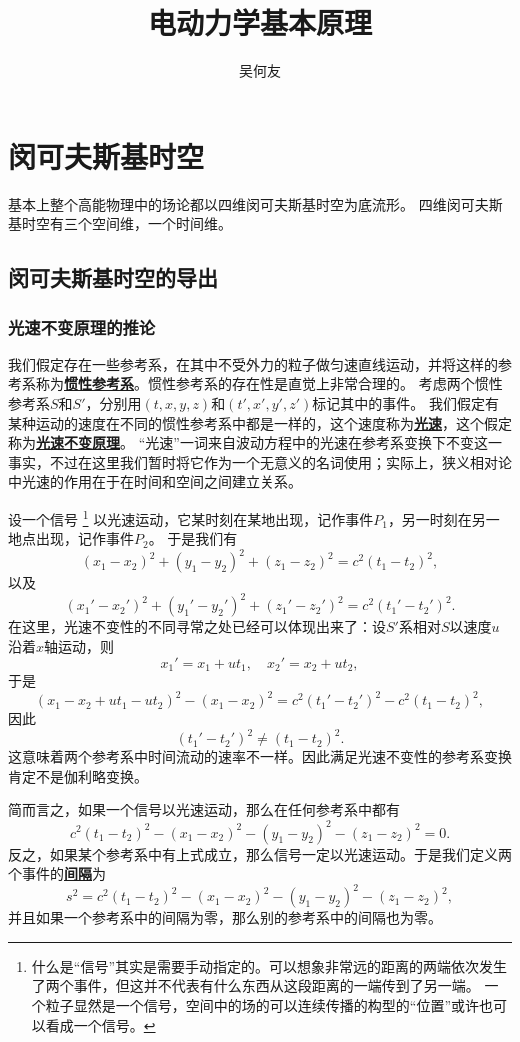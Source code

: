 \documentclass[UTF8, a4paper]{ctexart}
\title{电动力学基本原理}
\author{吴何友}
\newcommand*{\concept}[1]{\underline{\textbf{#1}}}
\begin{document}
\maketitle

\section{闵可夫斯基时空}\label{sec:minkowsky}

基本上整个高能物理中的场论都以四维闵可夫斯基时空为底流形。
四维闵可夫斯基时空有三个空间维，一个时间维。

\subsection{闵可夫斯基时空的导出}

\subsubsection{光速不变原理的推论}

我们假定存在一些参考系，在其中不受外力的粒子做匀速直线运动，并将这样的参考系称为\concept{惯性参考系}。惯性参考系的存在性是直觉上非常合理的。
考虑两个惯性参考系$S$和$S'$，分别用$(t, x, y, z)$和$(t', x', y', z')$标记其中的事件。
我们假定有某种运动的速度在不同的惯性参考系中都是一样的，这个速度称为\concept{光速}，这个假定称为\concept{光速不变原理}。
“光速”一词来自波动方程中的光速在参考系变换下不变这一事实，不过在这里我们暂时将它作为一个无意义的名词使用；实际上，狭义相对论中光速的作用在于在时间和空间之间建立关系。

设一个信号%
\footnote{什么是“信号”其实是需要手动指定的。可以想象非常远的距离的两端依次发生了两个事件，但这并不代表有什么东西从这段距离的一端传到了另一端。
一个粒子显然是一个信号，空间中的场的可以连续传播的构型的“位置”或许也可以看成一个信号。
}%
以光速运动，它某时刻在某地出现，记作事件$P_1$，另一时刻在另一地点出现，记作事件$P_2$。
于是我们有
\[
    (x_1 - x_2)^2 + (y_1 - y_2)^2 + (z_1 - z_2)^2 = c^2 (t_1 - t_2)^2, 
\]
以及
\[
    (x_1' - x_2')^2 + (y_1' - y_2')^2 + (z_1' - z_2')^2 = c^2 (t_1' - t_2')^2.
\]
在这里，光速不变性的不同寻常之处已经可以体现出来了：设$S'$系相对$S$以速度$u$沿着$x$轴运动，则
\[
    x_1' = x_1 + u t_1, \quad x_2' = x_2 + u t_2,
\]
于是
\[
    (x_1 - x_2 + u t_1 - u t_2)^2 - (x_1 - x_2)^2 = c^2 (t_1' - t_2')^2 - c^2 (t_1 - t_2)^2,
\]
因此
\[
    (t_1' - t_2')^2 \neq (t_1 - t_2)^2.
\]
这意味着两个参考系中时间流动的速率不一样。因此满足光速不变性的参考系变换肯定不是伽利略变换。

简而言之，如果一个信号以光速运动，那么在任何参考系中都有
\[
    c^2 (t_1 - t_2)^2 - (x_1 - x_2)^2 - (y_1 - y_2)^2 - (z_1 - z_2)^2 = 0.    
\]
反之，如果某个参考系中有上式成立，那么信号一定以光速运动。于是我们定义两个事件的\concept{间隔}为
\begin{equation}
    s^2 = c^2 (t_1 - t_2)^2 - (x_1 - x_2)^2 - (y_1 - y_2)^2 - (z_1 - z_2)^2,
\end{equation}
并且如果一个参考系中的间隔为零，那么别的参考系中的间隔也为零。
\end{document}
